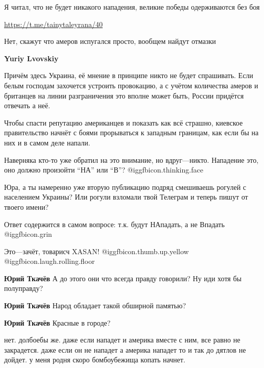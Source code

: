 \begin{multicols}{2}

Я читал, что не будет никакого нападения, великие победы одерживаются без боя

\url{https://t.me/tainytaleyrana/40}


Нет, скажут что амеров испугался просто, вообщем найдут отмазки

\textbf{Yuriy Lvovskiy}

Причём здесь Украина, её мнение в принципе никто не будет спрашивать. Если
белым господам захочется устроить провокацию, а с учётом количества амеров и
британцев на линии разграничения это вполне может быть, России придётся
отвечать а неё.


Чтобы спасти репутацию американцев и показать как всё страшно, киевское
правительство начнёт с боями прорываться к западным границам, как если бы на
них и в самом деле напали.


Наверняка кто-то уже обратил на это внимание, но вдруг—никто. Нападение это,
оно должно произойти \enquote{НА} или \enquote{В}?  @igg{fbicon.thinking.face} 


Юра, а ты намеренно уже вторую публикацию подряд смешиваешь рогулей с
населением Украины? Или рогули взломали твой Телеграм и теперь пишут от твоего
имени?


Ответ содержится в самом вопросе: т.к. будут НАпадать, а не Впадать @igg{fbicon.grin} 

Это—зачёт, товарисч XASAN!  @igg{fbicon.thumb.up.yellow}  @igg{fbicon.laugh.rolling.floor} 

\textbf{Юрий Ткачёв}
А до этого они что всегда правду говорили? Ну иди хотя бы полуправду?

\textbf{Юрий Ткачёв}
Народ обладает такой обширной памятью?

\textbf{Юрий Ткачёв}
Красные в городе?


нет. долбоебы же. даже если нападет и америка вместе с ним, все равно не
закрадется. даже если он не нападет а америка нападет то и так до дятлов не
дойдет. у меня родня скоро бомбоубежища копать начнет.

\end{multicols} %
